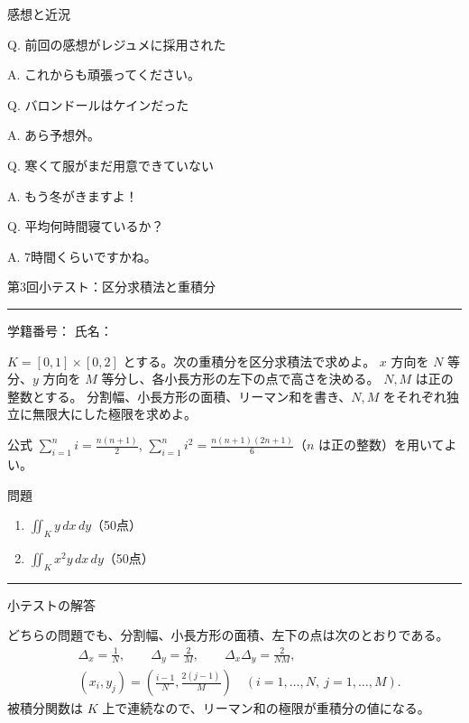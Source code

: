 \documentclass[a4paper,10pt,pdflatex,ja=standard,jafont=ipaex-type1,
  magstyle=real,scale=1]{bxjsarticle}
\newcommand{\handouttitle}[1]{%
  \begin{center}
    {\Large\color{ink}#1}\par\vspace{3mm}
    {\color{accent}\rule{0.88\linewidth}{0.7pt}}
  \end{center}\vspace{-2mm}}
\newcommand{\topic}[1]{\par\vspace{5pt}%
  {\large\sffamily\mdseries\color{accent}#1}\par\vspace{2pt}}
\newcommand{\feedback}[2]{%
  \par\addvspace{8pt}\noindent\begin{minipage}{\linewidth}%
  {\color{ink}Q. #1}\par\vspace{2pt}%
  {\color{accent}A. }#2%
  \end{minipage}\par}
\begin{document}
\topic{感想と近況}
\feedback{前回の感想がレジュメに採用された}{これからも頑張ってください。}
\feedback{バロンドールはケインだった}{あら予想外。}
\feedback{寒くて服がまだ用意できていない}{もう冬がきますよ！}
\feedback{平均何時間寝ているか？}{7時間くらいですかね。}
\clearpage

\thispagestyle{smalltestpages}
\handouttitle{第3回\quad 小テスト：区分求積法と重積分}

学籍番号：\underline{\hspace{40mm}}\hfill
氏名：\underline{\hspace{40mm}}

$K=[0,1]\times[0,2]$ とする。次の重積分を区分求積法で求めよ。
$x$ 方向を $N$ 等分、$y$ 方向を $M$ 等分し、各小長方形の左下の点で高さを決める。
$N,M$ は正の整数とする。
分割幅、小長方形の面積、リーマン和を書き、$N,M$ をそれぞれ独立に無限大にした極限を求めよ。


公式 $\displaystyle\sum_{i=1}^{n} i =\frac{n(n+1)}2$, $\displaystyle\sum_{i=1}^{n} i^2=\frac{n(n+1)(2n+1)}6$（$n$ は正の整数）を用いてよい。

\topic{問題}
\begin{enumerate}[label=\color{accent}\arabic*.,leftmargin=2.4em,itemsep=9pt]
\item $\displaystyle\iint_K y \,dx\,dy$\hfill（50点）
\par\vspace{3mm}

\item $\displaystyle\iint_K x^2 y\,dx\,dy$\hfill（50点）
\par\vspace{3mm}
\end{enumerate}

\par\vspace{4mm}
{\color{accent}\rule{\linewidth}{0.6pt}}
\topic{小テストの解答}
どちらの問題でも、分割幅、小長方形の面積、左下の点は次のとおりである。
$$
 \begin{aligned}
 &\Delta_x=\frac1N,\qquad \Delta_y=\frac2M,\qquad
 \Delta_x\Delta_y=\frac2{NM},\\
 &(x_i,y_j)=\left(\frac{i-1}{N},\frac{2(j-1)}{M}\right)
 \quad(i=1,\ldots,N,\ j=1,\ldots,M).
 \end{aligned}
$$
被積分関数は $K$ 上で連続なので、リーマン和の極限が重積分の値になる。
\end{document}
